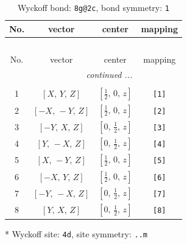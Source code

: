 \documentclass[fleqn,8pt]{jsarticle}
\begin{document}
\begin{longtable}{cccc}
\caption{Wyckoff bond: {\tt 8g@2c}, bond symmetry: {\tt 1}}
 \\
 \hline \hline
No. & vector & center & mapping \\ \hline \endfirsthead

\multicolumn{3}{l}{\tablename\ \thetable{}} \\
 \hline \hline
No. & vector & center & mapping \\ \hline \endhead

 \hline \hline
\multicolumn{3}{r}{\footnotesize\it continued ...} \\ \endfoot

 \hline \hline
\multicolumn{3}{r}{} \\ \endlastfoot

1 & $\left[ X,\, Y,\, Z \right]$ & $\left[ \frac{1}{2},\, 0,\, z \right]$ & {\tt [1]} \\ \hline
2 & $\left[ - X,\, - Y,\, Z \right]$ & $\left[ \frac{1}{2},\, 0,\, z \right]$ & {\tt [2]} \\ \hline
3 & $\left[ - Y,\, X,\, Z \right]$ & $\left[ 0,\, \frac{1}{2},\, z \right]$ & {\tt [3]} \\ \hline
4 & $\left[ Y,\, - X,\, Z \right]$ & $\left[ 0,\, \frac{1}{2},\, z \right]$ & {\tt [4]} \\ \hline
5 & $\left[ X,\, - Y,\, Z \right]$ & $\left[ \frac{1}{2},\, 0,\, z \right]$ & {\tt [5]} \\ \hline
6 & $\left[ - X,\, Y,\, Z \right]$ & $\left[ \frac{1}{2},\, 0,\, z \right]$ & {\tt [6]} \\ \hline
7 & $\left[ - Y,\, - X,\, Z \right]$ & $\left[ 0,\, \frac{1}{2},\, z \right]$ & {\tt [7]} \\ \hline
8 & $\left[ Y,\, X,\, Z \right]$ & $\left[ 0,\, \frac{1}{2},\, z \right]$ & {\tt [8]} \\
\end{longtable}
* Wyckoff site: {\tt 4d}, site symmetry: {\tt ..m}
\renewcommand{\arraystretch}{1.2}
\end{document}
